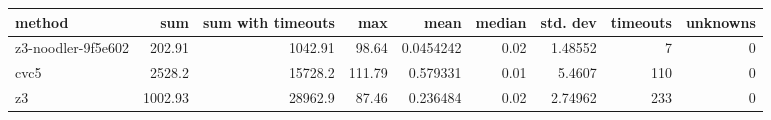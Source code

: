 \begin{tabular}{lrrrrrrrr}
\hline
 method             &     sum &   sum with timeouts &    max &      mean &   median &   std. dev &   timeouts &   unknowns \\
\hline
 z3-noodler-9f5e602 &  202.91 &             1042.91 &  98.64 & 0.0454242 &     0.02 &    1.48552 &          7 &          0 \\
 cvc5               & 2528.2  &            15728.2  & 111.79 & 0.579331  &     0.01 &    5.4607  &        110 &          0 \\
 z3                 & 1002.93 &            28962.9  &  87.46 & 0.236484  &     0.02 &    2.74962 &        233 &          0 \\
\hline
\end{tabular}
